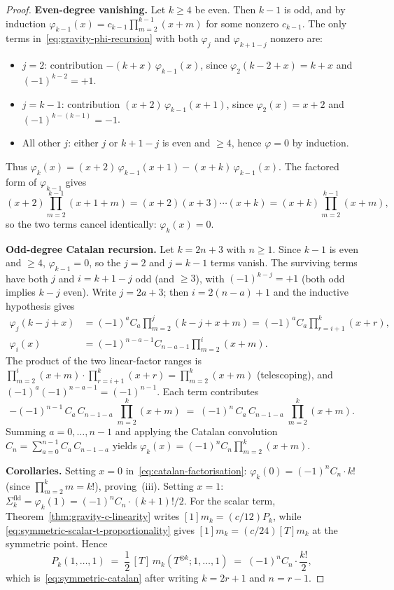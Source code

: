 \begin{proof}
\smallskip
\noindent\textbf{Even-degree vanishing.}
Let $k \ge 4$ be even. Then $k-1$ is odd, and by induction
$\varphi_{k-1}(x) = c_{k-1}\prod_{m=2}^{k-1}(x+m)$ for some
nonzero $c_{k-1}$. The only terms in~\eqref{eq:gravity-phi-recursion}
with both $\varphi_j$ and $\varphi_{k+1-j}$ nonzero are:
\begin{itemize}
\item $j = 2$: contribution
 $-(k{+}x)\,\varphi_{k-1}(x)$,
 since $\varphi_2(k{-}2{+}x) = k + x$ and
 $(-1)^{k-2} = +1$.
\item $j = k{-}1$: contribution
 $(x{+}2)\,\varphi_{k-1}(x{+}1)$,
 since $\varphi_2(x) = x + 2$ and $(-1)^{k-(k-1)} = -1$.
\item All other $j$: either $j$ or $k{+}1{-}j$ is even and
 $\ge 4$, hence $\varphi = 0$ by induction.
\end{itemize}
Thus $\varphi_k(x) = (x{+}2)\,\varphi_{k-1}(x{+}1) -
(x{+}k)\,\varphi_{k-1}(x)$. The factored form of
$\varphi_{k-1}$ gives
\[
(x{+}2)\prod_{m=2}^{k-1}(x{+}1{+}m)
= (x{+}2)(x{+}3)\cdots(x{+}k)
= (x{+}k)\prod_{m=2}^{k-1}(x{+}m),
\]
so the two terms cancel identically: $\varphi_k(x) = 0$.

\smallskip
\noindent\textbf{Odd-degree Catalan recursion.}
Let $k = 2n+3$ with $n \ge 1$. Since $k-1$ is even and $\ge 4$,
$\varphi_{k-1} = 0$, so the $j = 2$ and $j = k{-}1$ terms
vanish. The surviving terms have both $j$ and $i = k{+}1{-}j$
odd (and $\ge 3$), with $(-1)^{k-j} = +1$ (both odd implies
$k - j$ even). Write $j = 2a{+}3$; then $i = 2(n{-}a){+}1$ and
the inductive hypothesis gives
\begin{align*}
\varphi_j(k{-}j{+}x)
&= (-1)^a C_a\!\prod_{m=2}^{j}(k{-}j{+}x{+}m)
= (-1)^a C_a\!\prod_{r=i+1}^{k}(x{+}r),
\\[3pt]
\varphi_i(x)
&= (-1)^{n-a-1} C_{n-a-1}\!\prod_{m=2}^{i}(x{+}m).
\end{align*}
The product of the two linear-factor ranges is
$\prod_{m=2}^{i}(x{+}m) \cdot \prod_{r=i+1}^{k}(x{+}r)
= \prod_{m=2}^{k}(x{+}m)$ (telescoping), and
$(-1)^a(-1)^{n-a-1} = (-1)^{n-1}$. Each term contributes
\[
-(-1)^{n-1}\,C_a\,C_{n-1-a}\;\prod_{m=2}^{k}(x{+}m)
\;=\;
(-1)^n\,C_a\,C_{n-1-a}\;\prod_{m=2}^{k}(x{+}m).
\]
Summing $a = 0, \ldots, n{-}1$ and applying the Catalan
convolution
$C_n = \sum_{a=0}^{n-1} C_a\,C_{n-1-a}$
yields $\varphi_k(x) = (-1)^n C_n \prod_{m=2}^{k}(x{+}m)$.

\smallskip
\noindent\textbf{Corollaries.}
Setting $x = 0$ in~\eqref{eq:catalan-factorisation}:
$\varphi_k(0) = (-1)^n C_n \cdot k!$ (since
$\prod_{m=2}^{k} m = k!$), proving~(iii). Setting $x = 1$:
\(\Sigma_k^{\mathrm{fld}} = \varphi_k(1)
= (-1)^n C_n \cdot (k{+}1)!/2\). For the scalar term,
Theorem~\ref{thm:gravity-c-linearity} writes
\([1]m_k=(c/12)P_k\), while
\eqref{eq:symmetric-scalar-t-proportionality} gives
\([1]m_k=(c/24)[T]m_k\) at the symmetric point.  Hence
\[
P_k(1,\ldots,1)
\;=\;
\frac12\,[T]\,m_k(T^{\otimes k};1,\ldots,1)
\;=\;
(-1)^n C_n\cdot \frac{k!}{2},
\]
which is~\eqref{eq:symmetric-catalan} after writing
\(k=2r+1\) and \(n=r-1\).


\end{proof}
